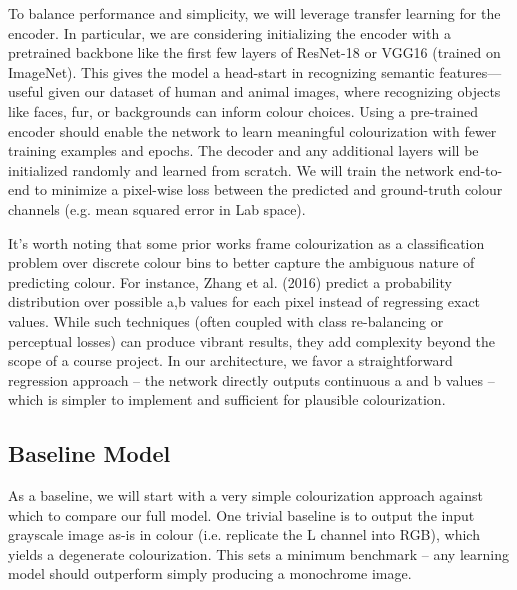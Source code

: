 \documentclass{article} %
\begin{document}
To balance performance and simplicity, we will leverage transfer learning for the encoder. In particular, we are considering initializing the encoder with a pretrained backbone like the first few layers of ResNet-18 or VGG16 (trained on ImageNet). This gives the model a head-start in recognizing semantic features—useful given our dataset of human and animal images, where recognizing objects like faces, fur, or backgrounds can inform colour choices. \cite{olah2022lettherebecolor} Using a pre-trained encoder should enable the network to learn meaningful colourization with fewer training examples and epochs. \cite{olah2022lettherebecolor} The decoder and any additional layers will be initialized randomly and learned from scratch. We will train the network end-to-end to minimize a pixel-wise loss between the predicted and ground-truth colour channels (e.g. mean squared error in Lab space).

It’s worth noting that some prior works frame colourization as a classification problem over discrete colour bins to better capture the ambiguous nature of predicting colour. For instance, Zhang et al. (2016) predict a probability distribution over possible a,b values for each pixel instead of regressing exact values. \cite{olah2022lettherebecolor} While such techniques (often coupled with class re-balancing or perceptual losses) can produce vibrant results, they add complexity beyond the scope of a course project. In our architecture, we favor a straightforward regression approach – the network directly outputs continuous a and b values – which is simpler to implement and sufficient for plausible colourization.

\subsection{Baseline Model}

As a baseline, we will start with a very simple colourization approach against which to compare our full model. One trivial baseline is to output the input grayscale image as-is in colour (i.e. replicate the L channel into RGB), which yields a degenerate colourization. This sets a minimum benchmark – any learning model should outperform simply producing a monochrome image.
\end{document}
